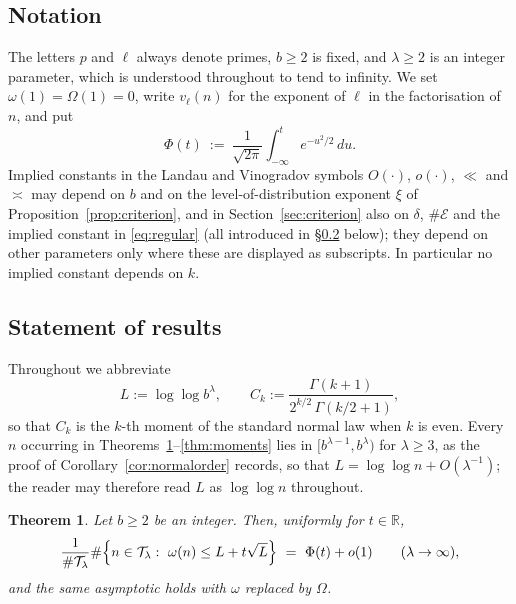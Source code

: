 \documentclass[11pt,a4paper]{article}
\theoremstyle{plain}
\newtheorem{theorem}{Theorem}[section]
\theoremstyle{definition}
\numberwithin{equation}{section}
\begin{document}
\subsection{Notation}\label{sec:notation}

The letters $p$ and $\ell$ always denote primes, $b\ge2$ is fixed, and $\lambda\ge2$ is an integer
parameter, which is understood throughout to tend to infinity. We set $\omega(1)=\Omega(1)=0$, write
$v_\ell(n)$ for the exponent of $\ell$ in the factorisation of $n$, and put
\[
\Phi(t)\ :=\ \frac1{\sqrt{2\pi}}\int_{-\infty}^{t}e^{-u^{2}/2}\,du .
\]
Implied constants in the Landau and Vinogradov symbols $O(\cdot)$, $o(\cdot)$, $\ll$ and $\asymp$ may
depend on $b$ and on the level-of-distribution exponent $\xi$ of Proposition~\ref{prop:criterion}, and
in Section~\ref{sec:criterion} also on $\delta$, $\#\mathcal E$ and the implied constant in
\eqref{eq:regular} (all introduced in \S\ref{sec:results} below); they depend on other parameters only
where these are displayed as subscripts. In particular no implied constant depends on $k$.

\subsection{Statement of results}\label{sec:results}

Throughout we abbreviate
\begin{equation}\label{eq:defCk}
L:=\log\log b^{\lambda},\qquad C_k:=\frac{\Gamma(k+1)}{2^{k/2}\,\Gamma(k/2+1)},
\end{equation}
so that $C_k$ is the $k$-th moment of the standard normal law when $k$ is even. Every $n$ occurring in
Theorems~\ref{thm:pal}--\ref{thm:moments} lies in $[b^{\lambda-1},b^{\lambda})$ for $\lambda\ge3$, as
the proof of Corollary~\ref{cor:normalorder} records, so that $L=\log\log n+O(\lambda^{-1})$; the
reader may therefore read $L$ as $\log\log n$ throughout.

\begin{theorem}\label{thm:pal}
Let $b\ge2$ be an integer. Then, uniformly for $t\in\mathbb R$,
\[
\frac1{\#\mathcal T_\lambda}\#\Bigl\{n\in\mathcal T_\lambda:\ \omega(n)\le L+t\sqrt L\Bigr\}
\ =\ \Phi(t)+o(1)\qquad(\lambda\to\infty),
\]
and the same asymptotic holds with $\omega$ replaced by $\Omega$.
\end{theorem}
\end{document}
